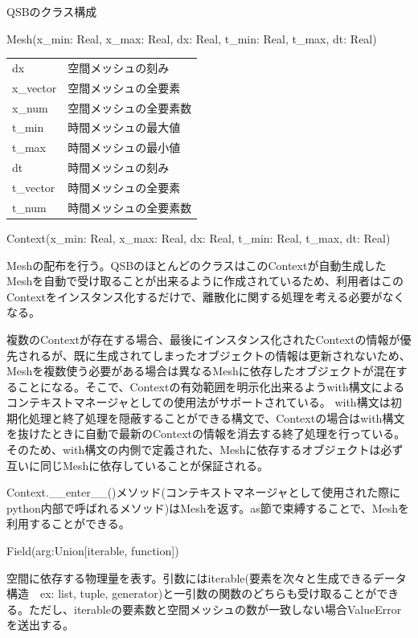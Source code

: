 \documentclass[a4paper, lualatex]{bxjsarticle}
\begin{document}
\begin{section}{QSBのクラス構成}
\begin{subsection}{Mesh(x\_min: Real, x\_max: Real, dx: Real, t\_min: Real, t\_max, dt: Real)}
\begin{table}[h]
\begin{tabular}{ll}
                dx & 空間メッシュの刻み\\
                x\_vector & 空間メッシュの全要素\\
                x\_num & 空間メッシュの全要素数\\
                t\_min & 時間メッシュの最大値\\
                t\_max & 時間メッシュの最小値\\
                dt & 時間メッシュの刻み\\
                t\_vector & 時間メッシュの全要素\\
                t\_num & 時間メッシュの全要素数\\
            \end{tabular}
        \end{table}
    \end{subsection}
    \begin{subsection}{Context(x\_min: Real, x\_max: Real, dx: Real, t\_min: Real, t\_max, dt: Real)}
        \par Meshの配布を行う。QSBのほとんどのクラスはこのContextが自動生成したMeshを自動で受け取ることが出来るように作成されているため、利用者はこのContextをインスタンス化するだけで、離散化に関する処理を考える必要がなくなる。
        \par 複数のContextが存在する場合、最後にインスタンス化されたContextの情報が優先されるが、既に生成されてしまったオブジェクトの情報は更新されないため、Meshを複数使う必要がある場合は異なるMeshに依存したオブジェクトが混在することになる。そこで、Contextの有効範囲を明示化出来るようwith構文によるコンテキストマネージャとしての使用法がサポートされている。
        with構文は初期化処理と終了処理を隠蔽することができる構文で、Contextの場合はwith構文を抜けたときに自動で最新のContextの情報を消去する終了処理を行っている。そのため、with構文の内側で定義された、Meshに依存するオブジェクトは必ず互いに同じMeshに依存していることが保証される。
        \par Context.\_\_enter\_\_()メソッド(コンテキストマネージャとして使用された際にpython内部で呼ばれるメソッド)はMeshを返す。as節で束縛することで、Meshを利用することができる。
\newpage
        
    \end{subsection}
    \begin{subsection}{Field(arg:Union[iterable, function])}
        \par 空間に依存する物理量を表す。引数にはiterable(要素を次々と生成できるデータ構造　ex: list, tuple, generator)と一引数の関数のどちらも受け取ることができる。ただし、iterableの要素数と空間メッシュの数が一致しない場合ValueErrorを送出する。

\end{subsection}
\end{section}
\end{document}
